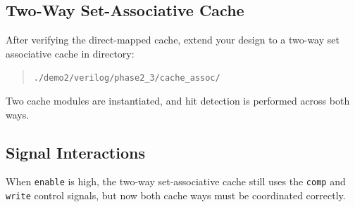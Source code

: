 \documentclass[12pt]{article}
\begin{document}
\subsection*{Two-Way Set-Associative Cache}

After verifying the direct-mapped cache, extend your design to a two-way set associative cache
in directory:

\begin{quote}
\texttt{./demo2/verilog/phase2\_3/cache\_assoc/}
\end{quote}

Two cache modules are instantiated, and hit detection is performed across both ways.

\subsection*{Signal Interactions}

When \texttt{enable} is high, the two-way set-associative cache still uses the
\texttt{comp} and \texttt{write} control signals, but now both cache ways must
be coordinated correctly.
\end{document}

